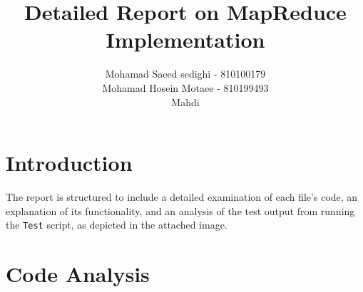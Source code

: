 \documentclass[a4paper,12pt]{article}
\title{Detailed Report on MapReduce Implementation}
\author{Mohamad Saeed sedighi - 810100179\\Mohamad Hosein Motaee - 810199493\\Mahdi}
\begin{document}
\maketitle

\section{Introduction}
The report is structured to include a detailed examination of each file's code, an explanation of its functionality, and an analysis of the test output from running the \texttt{Test} script, as depicted in the attached image.

\section{Code Analysis}
\end{document}
